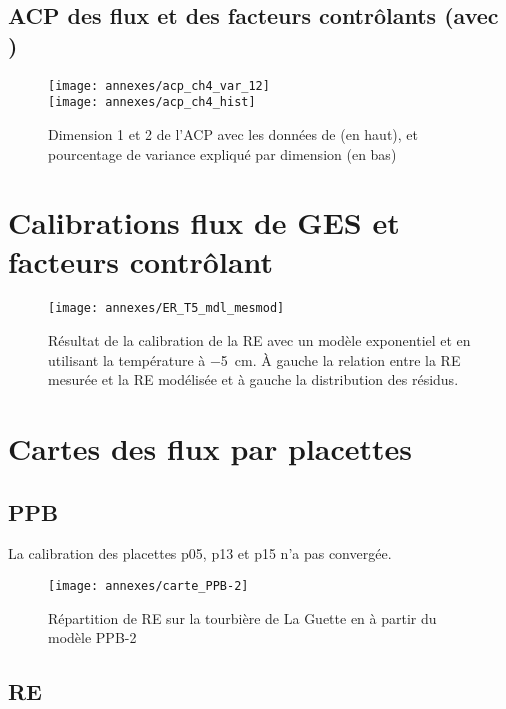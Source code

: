 \subsection{ACP des flux et des facteurs contrôlants (avec \chh)}

\begin{figure}[!hbt]
\centering
\texttt{[image: annexes/acp\_ch4\_var\_12]}\\
\texttt{[image: annexes/acp\_ch4\_hist]}
\caption{Dimension 1 et 2 de l'ACP avec les données de \chh (en haut), et pourcentage de variance expliqué par dimension (en bas)}
\label{fig:acp_ch4}
\end{figure}


\section{Calibrations flux de GES et facteurs contrôlant}
\label{sec:calib_flux}

\begin{figure}[!hbt]
\centering
\texttt{[image: annexes/ER\_T5\_mdl\_mesmod]}\\
\caption{Résultat de la calibration de la RE avec un modèle exponentiel et en utilisant la température à \SI{-5}{\centi\metre}. À gauche la relation entre la RE mesurée et la RE modélisée et à gauche la distribution des résidus.}
\label{fig:RE_T5}
\end{figure}




\clearpage
\section{Cartes des flux par placettes}
\label{sec:carte_flux}

\subsection{PPB}
\label{subsec:carte_ppb}
La calibration des placettes p05, p13 et p15 n'a pas convergée.

\begin{figure}[!hbt]
\centering
\texttt{[image: annexes/carte\_PPB-2]}
\caption{Répartition de RE sur la tourbière de La Guette en \si{\gcma} à partir du modèle PPB-2}
\label{fig:rep_PPB-2}
\end{figure}

\clearpage
\subsection{RE}
\label{subsec:carte_re}

